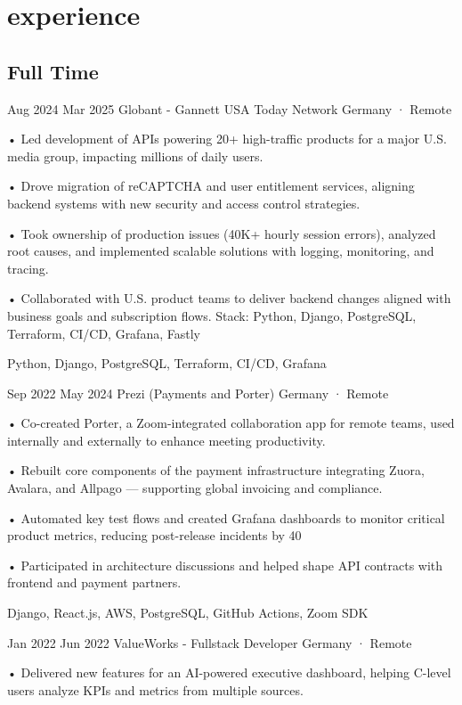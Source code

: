 \documentclass[a4paper,nocolors]{friggeri-cv}
\begin{document}
\section{experience}

\subsection{Full Time}

\begin{entrylist}


\entryexperience
{Aug 2024}
{Mar 2025}
{Globant - Gannett USA Today Network }
{Germany · Remote}
{
• Led development of APIs powering 20+ high-traffic products for a major U.S. media group, impacting millions of daily users.

• Drove migration of reCAPTCHA and user entitlement services, aligning backend systems with new security and access control strategies.

• Took ownership of production issues (40K+ hourly session errors), analyzed root causes, and implemented scalable solutions with logging, monitoring, and tracing.

• Collaborated with U.S. product teams to deliver backend changes aligned with business goals and subscription flows.
Stack: Python, Django, PostgreSQL, Terraform, CI/CD, Grafana, Fastly
}
{Python, Django, PostgreSQL, Terraform, CI/CD, Grafana}

\entryexperience
{Sep 2022}
{May 2024}
{Prezi (Payments and Porter)}
{Germany · Remote}
{
• Co-created Porter, a Zoom-integrated collaboration app for remote teams, used internally and externally to enhance meeting productivity.

• Rebuilt core components of the payment infrastructure integrating Zuora, Avalara, and Allpago — supporting global invoicing and compliance.

• Automated key test flows and created Grafana dashboards to monitor critical product metrics, reducing post-release incidents by 40%

• Participated in architecture discussions and helped shape API contracts with frontend and payment partners.
}
{Django, React.js, AWS, PostgreSQL, GitHub Actions, Zoom SDK}


\entryexperience
{Jan 2022}
{Jun 2022}
{ValueWorks - Fullstack Developer}
{Germany · Remote}
{
• Delivered new features for an AI-powered executive dashboard, helping C-level users analyze KPIs and metrics from multiple sources.

}
\end{entrylist}
\end{document}
